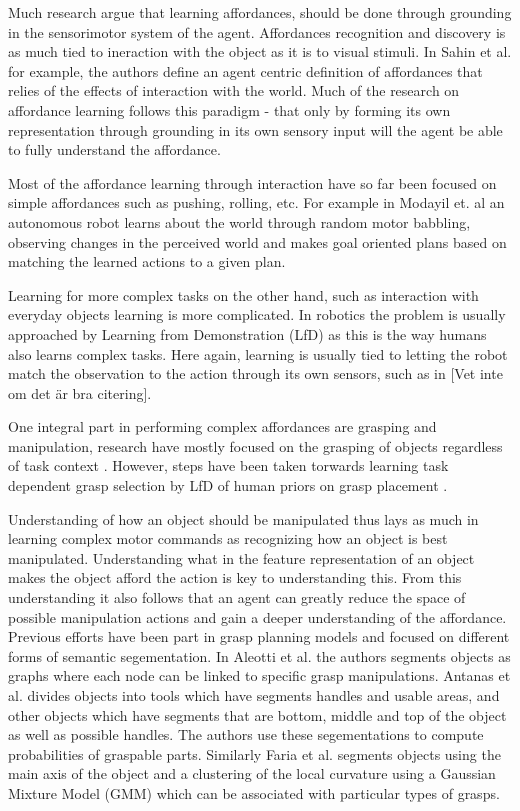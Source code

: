 Much research argue that learning affordances, should be done through
grounding in the sensorimotor system of the agent. Affordances
recognition and discovery is as much tied to ineraction with the object
as it is to visual stimuli. In Sahin et al. \cite{Sahin:2007gr} for
example, the authors define an agent centric definition of affordances
that relies of the effects of interaction with the world. Much of the
research on affordance learning follows this paradigm - that only by
forming its own representation through grounding in its own sensory
input will the agent be able to fully understand the affordance.

Most of the affordance learning through interaction have so far been
focused on simple affordances such as pushing, rolling, etc. For example
in Modayil et. al \cite{Modayil:2008it} an autonomous robot learns about
the world through random motor babbling, observing changes in the
perceived world and makes goal oriented plans based on matching the
learned actions to a given plan.

Learning for more complex tasks on the other hand, such as interaction
with everyday objects learning is more complicated. In robotics the
problem is usually approached by Learning from Demonstration (LfD) as
this is the way humans also learns complex tasks. Here again, learning
is usually tied to letting the robot match the observation to the action
through its own sensors, such as in \cite{Faria:2014ug}{[}Vet inte om
det är bra citering{]}.

One integral part in performing complex affordances are grasping and
manipulation, research have mostly focused on the grasping of objects
regardless of task context \cite{Bohg:H95zG3Ya}. However, steps have
been taken torwards learning task dependent grasp selection by LfD of
human priors on grasp placement \cite{Hjelm:2015hw}.

Understanding of how an object should be manipulated thus lays as much
in learning complex motor commands as recognizing how an object is best
manipulated. Understanding what in the feature representation of an
object makes the object afford the action is key to understanding this.
From this understanding it also follows that an agent can greatly reduce
the space of possible manipulation actions and gain a deeper
understanding of the affordance. Previous efforts have been part in
grasp planning models and focused on different forms of semantic
segementation. In Aleotti et al. \cite{Aleotti:2011hc} the authors
segments objects as graphs where each node can be linked to specific
grasp manipulations. Antanas et al. \cite{Antanas:2014uo} divides
objects into tools which have segments handles and usable areas, and
other objects which have segments that are bottom, middle and top of the
object as well as possible handles. The authors use these segementations
to compute probabilities of graspable parts. Similarly Faria et al.
\cite{Faria:2014ug} segments objects using the main axis of the object
and a clustering of the local curvature using a Gaussian Mixture Model
(GMM) which can be associated with particular types of grasps.

